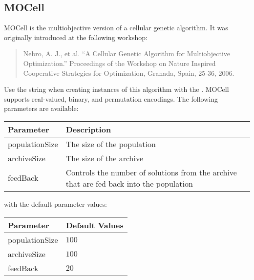 \subsection{MOCell}
MOCell is the multiobjective version of a cellular genetic algorithm.  It was originally introduced at the following workshop:
\begin{quote}
Nebro, A. J., et al.  ``A Cellular Genetic Algorithm for Multiobjective Optimization.''  Proceedings of the Workshop on Nature Inspired Cooperative Strategies for Optimization, Granada, Spain, 25-36, 2006.
\end{quote}
Use the string  when creating instances of this algorithm with the .  MOCell supports real-valued, binary, and permutation encodings.  The following parameters are available:
\newline
\newline
\begin{tabularx}{\linewidth}{lX}
  \hline
  Parameter & Description \\
  \hline
  populationSize & The size of the population \\
  archiveSize & The size of the archive \\
  feedBack & Controls the number of solutions from the archive that are fed back into the population \\
  \hline
\end{tabularx}
\newline
\newline
with the default parameter values:
\newline
\newline
\begin{tabularx}{\linewidth}{lX}
  \hline
  Parameter & Default Values \\
  \hline
  populationSize & $100$ \\
  archiveSize & $100$ \\
  feedBack & $20$ \\
  \hline
\end{tabularx}

